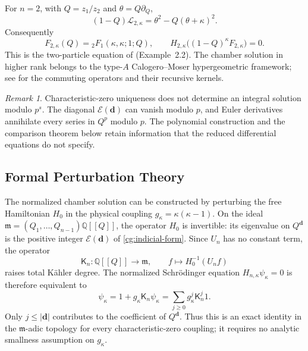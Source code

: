 \documentclass[11pt]{amsart}
\theoremstyle{definition}
\theoremstyle{remark}
\newtheorem{remark}[theorem]{Remark}
\numberwithin{equation}{section}
\newcommand{\Q}{\mathbb Q}
\begin{document}
For $n=2$, with $Q=z_1/z_2$ and $\theta=Q\partial_Q$,
\begin{equation}\label{cm:two-particle-vertex}
 (1-Q)\mathcal L_{2,\kappa}
 =\theta^2-Q(\theta+\kappa)^2.
\end{equation}
Consequently
\begin{equation}\label{cm:hypergeometric-wave}
 F_{2,\kappa}(Q)={}_2F_1(\kappa,\kappa;1;Q),\qquad
 H_{2,\kappa}\bigl((1-Q)^\kappa F_{2,\kappa}\bigr)=0.
\end{equation}
This is the two-particle equation of \cite{SV23} (Example~2.2).
The chamber solution in higher rank belongs to the type-$A$
Calogero--Moser hypergeometric framework; see \cite{HR15} for
the commuting operators and their recursive kernels.

\begin{remark}\label{cg:uniqueness-scope}
Characteristic-zero uniqueness does not determine an integral
solution modulo $p^s$. The diagonal
$\mathcal E(\boldsymbol d)$ can vanish modulo $p$, and Euler
derivatives annihilate every series in $Q^p$ modulo $p$.
The polynomial construction and the comparison theorem below
retain information that the reduced differential equations do
not specify.
\end{remark}

\subsection{Formal Perturbation Theory}
\label{cm:formal-perturbation}
The normalized chamber solution can be constructed by perturbing
the free Hamiltonian $H_0$ in the physical coupling
$g_\kappa=\kappa(\kappa-1)$. On the ideal
$\mathfrak m=(Q_1,\ldots,Q_{n-1})\Q[[Q]]$, the operator
$H_0$ is invertible: its eigenvalue on $Q^{\boldsymbol d}$ is
the positive integer $\mathcal E(\boldsymbol d)$ of
\eqref{cg:indicial-form}. Since $U_n$ has no constant term,
the operator
\[
 \mathsf K_n:\Q[[Q]]\longrightarrow\mathfrak m,
 \qquad f\longmapsto H_0^{-1}(U_nf)
\]
raises total K\"ahler degree. The normalized Schr\"odinger
equation $H_{n,\kappa}\psi_\kappa=0$ is therefore equivalent to
\begin{equation}\label{cm:perturbation-series}
 \psi_\kappa
 =1+g_\kappa\mathsf K_n\psi_\kappa
 =\sum_{j\geq0}g_\kappa^j\mathsf K_n^j1.
\end{equation}
Only $j\leq|\boldsymbol d|$ contributes to the coefficient of
$Q^{\boldsymbol d}$. Thus this is an exact identity in the
$\mathfrak m$-adic topology for every characteristic-zero
coupling; it requires no analytic smallness assumption on
$g_\kappa$.
\end{document}
